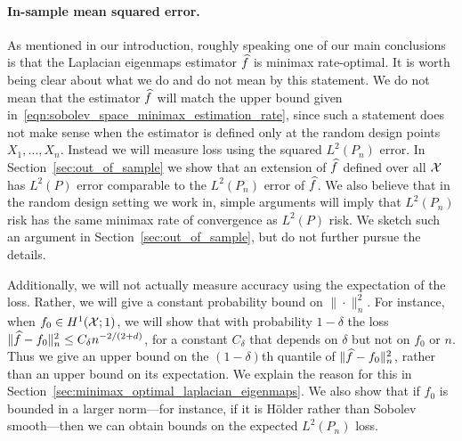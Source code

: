 \paragraph{In-sample mean squared error.}
As mentioned in our introduction, roughly speaking one of our main conclusions is that the Laplacian eigenmaps estimator $\widehat{f}$ is minimax rate-optimal. It is worth being clear about what we do and do not mean by this statement. We do not mean that the estimator $\widehat{f}$ will match the upper bound given in~\eqref{eqn:sobolev_space_minimax_estimation_rate}, since such a statement does not make sense when the estimator is defined only at the random design points $X_1,\ldots,X_n$. Instead we will measure loss using the squared $L^2(P_n)$ error. In Section~\ref{sec:out_of_sample} we show that an extension of $\widehat{f}$ defined over all $\mathcal{X}$ has $L^2(P)$ error comparable to the $L^2(P_n)$ error of $\widehat{f}$. We also believe that in the random design setting we work in, simple arguments will imply that $L^2(P_n)$ risk has the same minimax rate of convergence as $L^2(P)$ risk. We sketch such an argument in Section~\ref{sec:out_of_sample}, but do not further pursue the details. 

Additionally, we will not actually measure accuracy using the expectation of the loss. Rather, we will give a constant probability bound on $\|\cdot\|_n^2$. For instance, when $f_0 \in H^1(\mathcal{X};1)$, we will show that with probability $1 - \delta$ the loss $\|\widehat{f} - f_0\|_n^2 \leq C_{\delta} n^{-2/(2 + d)}$, for a constant $C_{\delta}$ that depends on $\delta$ but not on $f_0$ or $n$. Thus we give an upper bound on the $(1 - \delta)$th quantile of $\|\widehat{f} - f_0\|_n^2$, rather than an upper bound on its expectation. We explain the reason for this in Section~\ref{sec:minimax_optimal_laplacian_eigenmaps}. We also show that if $f_0$ is bounded in a larger norm---for instance, if it is H\"{o}lder rather than Sobolev smooth---then we can obtain bounds on the expected $L^2(P_n)$ loss.

